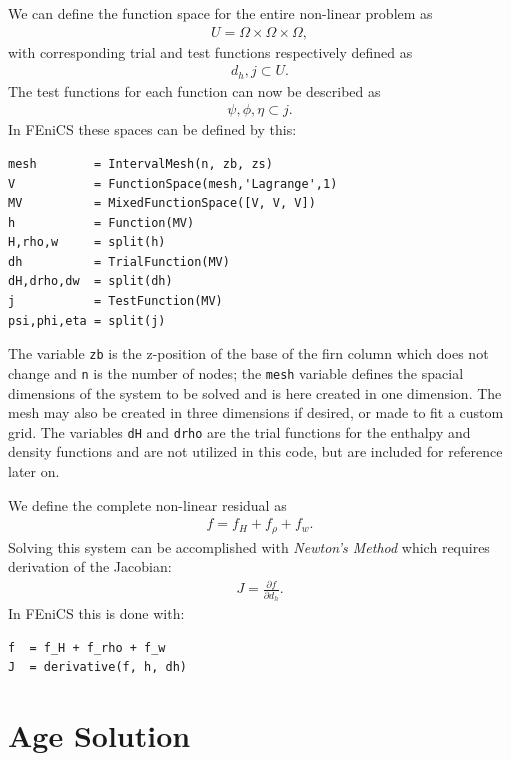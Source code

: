\documentclass{article}%
\begin{document}
We can define the function space for the entire non-linear problem as 
\begin{align*}
    U = \Omega \times \Omega \times \Omega,
\end{align*}
with corresponding trial and test functions respectively defined as
\begin{align*}
    d_h, j \subset U.
\end{align*}
The test functions for each function can now be described as
\begin{align*}
    \psi, \phi, \eta \subset j.
\end{align*}
In FEniCS these spaces can be defined by this:
\footnotesize
\begin{verbatim}
mesh        = IntervalMesh(n, zb, zs)
V           = FunctionSpace(mesh,'Lagrange',1)
MV          = MixedFunctionSpace([V, V, V])
h           = Function(MV)
H,rho,w     = split(h)    
dh          = TrialFunction(MV)
dH,drho,dw  = split(dh)
j           = TestFunction(MV)
psi,phi,eta = split(j)
\end{verbatim}
\normalsize
The variable \texttt{zb} is the z-position of the base of the firn column which does not change and \texttt{n} is the number of nodes; the \texttt{mesh} variable defines the spacial dimensions of the system to be solved and is here created in one dimension.  The mesh may also be created in three dimensions if desired, or made to fit a custom grid.  The variables \texttt{dH} and \texttt{drho} are the trial functions for the enthalpy and density functions and are not utilized in this code, but are included for reference later on.

We define the complete non-linear residual as 
\begin{align*}
    f = f_H + f_{\rho} + f_w.
\end{align*}
Solving this system can be accomplished with \emph{Newton's Method} which requires derivation of the Jacobian:
\begin{align*}
    J = \frac{\partial f}{\partial d_h}.
\end{align*}
In FEniCS this is done with:
\footnotesize
\begin{verbatim}
f  = f_H + f_rho + f_w
J  = derivative(f, h, dh)
\end{verbatim}
\normalsize


\section{Age Solution}
\end{document}
